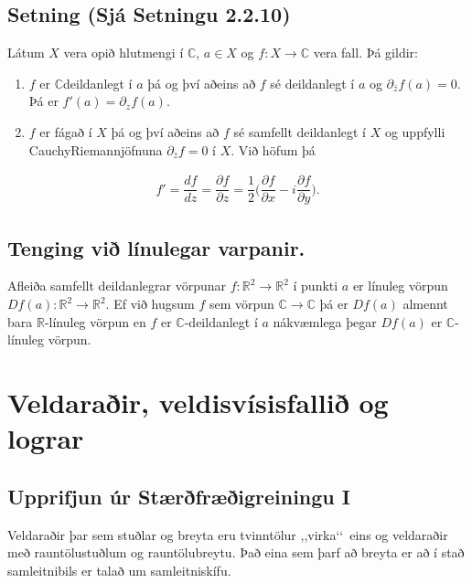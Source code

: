 \documentclass[a4paper,10pt,icelandic]{sphinxmanual}
\begin{document}
\subsection{Setning (Sjá Setningu 2.2.10)}
\label{\detokenize{Kafli02:setning-sja-setningu-2-2-10}}
Látum \(X\) vera opið hlutmengi í \({\mathbb{C}}\), \(a\in X\) og \(f:X\to {\mathbb{C}}\) vera fall. Þá gildir:
\begin{enumerate}
%
\item {} 
\(f\) er \({\mathbb{C}}\)\textendash{}deildanlegt í \(a\) þá og því aðeins að \(f\) sé deildanlegt í \(a\) og \({\partial}_{\bar z}f(a)=0\). Þá er \(f'(a)={\partial}_zf(a)\).

\item {} 
\(f\) er fágað í \(X\) þá og því aðeins að \(f\) sé samfellt deildanlegt í \(X\) og uppfylli Cauchy\textendash{}Riemann\textendash{}jöfnuna \({\partial}_{\bar z}f=0\) í \(X\). Við höfum þá

\end{enumerate}
\begin{equation*}
\begin{split}f'=\dfrac{df}{dz}=\dfrac{\partial f}{\partial z}=\dfrac 12\bigg(
\dfrac{\partial f}{\partial x}-i\dfrac{\partial f}{\partial y}\bigg).\end{split}
\end{equation*}

\subsection{Tenging við línulegar varpanir.}
\label{\detokenize{Kafli02:tenging-vi-linulegar-varpanir}}
Afleiða samfellt deildanlegrar vörpunar
\(f:\mathbb{R}^2\rightarrow\mathbb{R}^2\) í punkti \(a\) er línuleg vörpun
\(Df(a):\mathbb{R}^2\rightarrow\mathbb{R}^2\). Ef við hugsum \(f\) sem vörpun
\({\mathbb{C}}\rightarrow{\mathbb{C}}\) þá er \(Df(a)\) almennt bara
\(\mathbb{R}\)-línuleg vörpun en \(f\) er \({\mathbb{C}}\)-deildanlegt í
\(a\) nákvæmlega þegar \(Df(a)\) er \({\mathbb{C}}\)-línuleg vörpun.


\section{Veldaraðir, veldisvísisfallið og lograr}
\label{\detokenize{Kafli02:veldarair-veldisvisisfalli-og-lograr}}

\subsection{Upprifjun úr Stærðfræðigreiningu I}
\label{\detokenize{Kafli02:upprifjun-ur-staerfraeigreiningu-i}}
Veldaraðir þar sem stuðlar og breyta eru tvinntölur ,,virka‘‘ eins og veldaraðir með rauntölustuðlum og rauntölubreytu. Það eina sem þarf að breyta er að í stað samleitnibils er talað um samleitniskífu.
\end{document}
